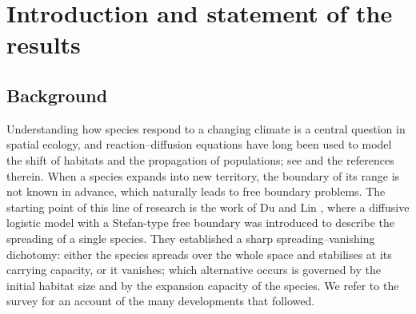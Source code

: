 \documentclass[reqno]{amsart}
\theoremstyle{plain}
\theoremstyle{definition}
\theoremstyle{remark}
\begin{document}

\dedicatory{}


\maketitle

\section{Introduction and statement of the results}\label{sec_1}

\subsection{Background}

Understanding how species respond to a changing climate is a central question in
spatial ecology, and reaction--diffusion equations have long been used to model
the shift of habitats and the propagation of populations; see
\cite{MR2471053,MR3691993,MR3377515} and the references therein. When a species
expands into new territory, the boundary of its range is not known in advance,
which naturally leads to free boundary problems. The starting point of this line
of research is the work of Du and Lin \cite{MR2607347}, where a diffusive
logistic model with a Stefan-type free boundary was introduced to describe the
spreading of a single species. They established a sharp spreading--vanishing
dichotomy: either the species spreads over the whole space and stabilises at its
carrying capacity, or it vanishes; which alternative occurs is governed by the
initial habitat size and by the expansion capacity of the species. We refer to
the survey \cite{MR4404216} for an account of the many developments that
followed.
\end{document}
